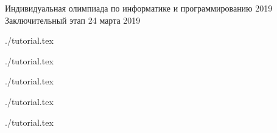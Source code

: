 \documentclass [11pt, a4paper, oneside] {article}
\begin{document}
\contest
{Индивидуальная олимпиада по информатике и программированию 2019}%
{Заключительный этап}%
{24 марта 2019}%


\renewcommand{\t}{\texttt}

\graphicspath{{../../problems/median/statements/russian/}}
{./tutorial.tex}
\graphicspath{{../../problems/two-texts/statements/russian/}}
{./tutorial.tex}
\graphicspath{{../../problems/decoding/statements/russian/}}
{./tutorial.tex}
\graphicspath{{../../problems/random-matrix/statements/russian/}}
{./tutorial.tex}
\graphicspath{{../../problems/orders/statements/russian/}}
{./tutorial.tex}
\end{document}
